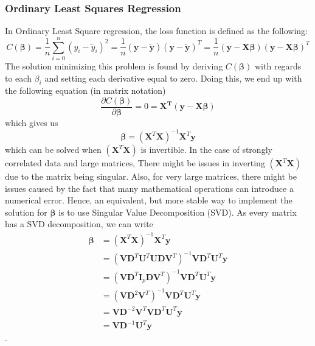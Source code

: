 \documentclass[11pt,a4paper]{article}
\begin{document}
\subsubsection{Ordinary Least Squares Regression}
In Ordinary Least Square regression, the loss function is defined as the following:
\begin{equation*}
C(\bm{\beta})= \frac{1}{n}\sum_{i=0}^n\left( y_i-\tilde y_i \right)^2
=\frac{1}{n}(\bm{y}-\bm{\tilde y})(\bm{y}-\bm{\tilde y})^T=
\frac{1}{n}(\bm{y}-\bm{X\beta})(\bm{y}-\bm{X\beta})^T
\end{equation*}
The solution minimizing this problem is found by deriving $C(\bm{\beta})$ with regards to each $\beta_i$ and setting each derivative equal to zero. Doing this, we end up with the following equation (in matrix notation)
\begin{equation*}
\frac{\partial C(\bm{\beta})}{\partial\bm{\beta}}=0=\bm{X^T}(\bm{y}-\bm{X\beta})
\end{equation*}
which gives us
\begin{equation*}
\bm{\beta}=(\bm{X}^T\bm{X})^{-1}\bm{X}^T\bm{y}
\end{equation*}
which can be solved when $(\bm{X}^T\bm{X})$ is invertible. In the case of strongly correlated data and large matrices, There might be issues in inverting $(\bm{X}^T\bm{X})$ due to the matrix being singular. Also, for very large matrices, there might be issues caused by the fact that many mathematical operations can introduce a numerical error. Hence, an equivalent, but more stable way to implement the solution for $\bm{\beta}$ is to use Singular Value Decomposition (SVD). As every matrix has a SVD decomposition, we can write
\begin{equation}\label{SVD_OLS}
\begin{split}\bm{\beta} & =\left(\bm{X}^T\bm{X}\right)^{-1}\bm{X}^T\bm{y}\\
& = \left(\bm{V}\bm{D}^T\bm{U}^T\bm{U}\bm{D}\bm{V}^T\right)^{-1}\bm{V}\bm{D}^T\bm{U}^T\bm{y}\\
& = \left(\bm{V}\bm{D}^T\bm{I}_p\bm{D}\bm{V}^T\right)^{-1}\bm{V}\bm{D}^T\bm{U}^T\bm{y}\\
& = \left(\bm{V}\bm{D}^2\bm{V}^T\right)^{-1}\bm{V}\bm{D}^T\bm{U}^T\bm{y}\\
& = \bm{V}\bm{D}^{-2}\bm{V}^T\bm{V}\bm{D}^T\bm{U}^T\bm{y}\\
& = \bm{V}\bm{D}^{-1}\bm{U}^T\bm{y}\end{split}
\end{equation}.
\end{document}
